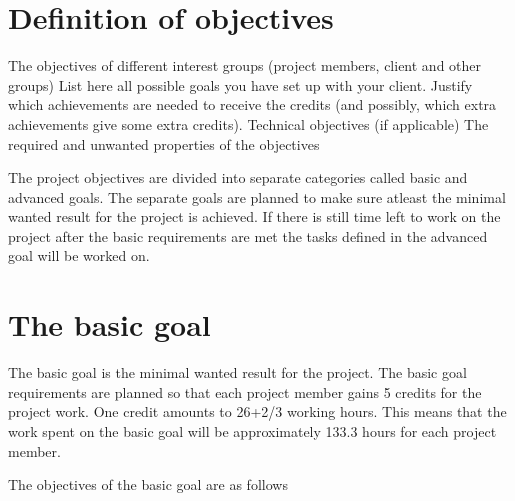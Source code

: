 \section{Definition of objectives}

The objectives of different interest groups (project members, client and other
groups)
List here all possible goals you have set up with your client. Justify which
achievements are needed to receive the credits (and possibly, which extra
achievements give some extra credits).
Technical objectives (if applicable)
The required and unwanted properties of the objectives


The project objectives are divided into separate categories called basic and advanced goals. The separate goals are planned to make sure atleast the minimal wanted result for the project is achieved. If there is still time left to work on the project after the basic requirements are met the tasks defined in the advanced goal will be worked on. 

\section{The basic goal}

The basic goal is the minimal wanted result for the project. The basic goal requirements are planned so that each project member gains 5 credits for the project work. One credit amounts to 26+2/3 working hours. This means that the work spent on the basic goal will be approximately 133.3 hours for each project member. 

The objectives of the basic goal are as follows

